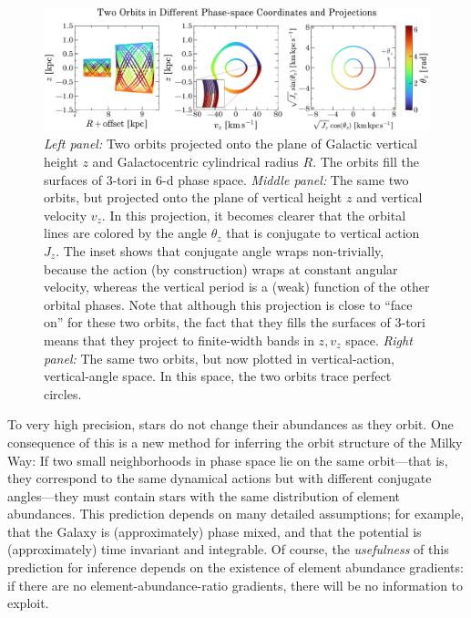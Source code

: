 \documentclass[modern]{aastex63}
\begin{document}
\begin{figure}[!tp]
  \begin{mdframed}
  \color{captiongray}
  \begin{center}
  \includegraphics[width=\textwidth]{zvz-orbit-demo.pdf}
  \end{center}
  \caption{%
    \textsl{Left panel:} Two orbits projected onto the plane of
    Galactic vertical height $z$ and Galactocentric cylindrical radius
    $R$. The orbits fill the surfaces of 3-tori in 6-d phase space.
    \textsl{Middle panel:} The same two orbits, but projected onto the plane
    of vertical height $z$ and vertical velocity $v_z$. In this projection,
    it becomes clearer that the orbital lines are
    colored by the angle $\theta_z$ that is conjugate to vertical action $J_z$.
    The inset shows that conjugate angle wraps non-trivially, because the action
    (by construction) wraps at constant angular velocity, whereas the vertical period
    is a (weak) function of the other orbital phases.
    Note that although this projection is close to ``face on'' for these two
    orbits, the fact that they fills the surfaces of 3-tori means that they
    project to finite-width bands in $z, v_z$ space.
    \textsl{Right panel:} The same two orbits, but now plotted in vertical-action,
    vertical-angle space. In this space, the two orbits trace perfect circles.
  \label{fig:zvz-demo}
  }
  \end{mdframed}
\end{figure}

To very high precision, stars do not change their abundances as they orbit.
One consequence of this is a new method for inferring the orbit structure of the
Milky Way:
If two small neighborhoods in phase space lie on the same orbit---that is, they
correspond to the same dynamical actions but with different conjugate
angles---they must contain stars with the same distribution of element
abundances.
This prediction depends on many detailed assumptions; for example, that the
Galaxy is (approximately) phase mixed, and that the potential is (approximately)
time invariant and integrable.
Of course, the \emph{usefulness} of this prediction for inference depends on the
existence of element abundance gradients: if there are no
element-abundance-ratio gradients, there will be no information to exploit.
\end{document}
